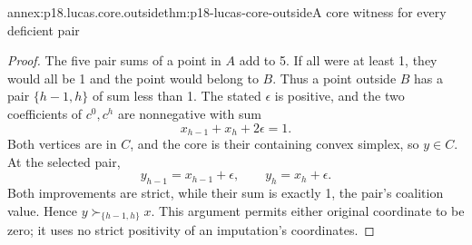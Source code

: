 \begin{annexitem}{annex:p18.lucas.core.outside}{thm:p18-lucas-core-outside}{A core witness for every deficient pair}
\begin{proof}
The five pair sums of a point in \(A\) add to 5. If all
were at least 1, they would all be 1 and the point would
belong to \(B\). Thus a point outside \(B\) has a pair
\(\{h-1,h\}\) of sum less than 1.
The stated \(\epsilon\) is positive, and the two coefficients
of \(c^0,c^h\) are nonnegative with sum
\[
                     x_{h-1}+x_h+2\epsilon=1.
\]
Both vertices are in \(C\), and the core is their containing
convex simplex, so \(y\in C\). At the selected pair,
\[
                  y_{h-1}=x_{h-1}+\epsilon,\qquad
                  y_h=x_h+\epsilon.
\]
Both improvements are strict, while their sum is exactly
1, the pair's coalition value. Hence
\(y\succ_{\{h-1,h\}}x\). This argument permits either original
coordinate to be zero; it uses no strict positivity of an
imputation's coordinates.
\end{proof}
\end{annexitem}

